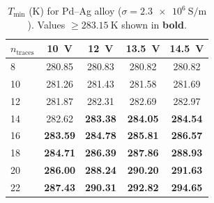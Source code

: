 \begin{table}[H]
    \centering
    \caption{$T_\text{min}$ (K) for Pd--Ag alloy ($\sigma = \SI{2.3e6}{\siemens\per\metre}$). Values $\geq \SI{283.15}{\kelvin}$ shown in \textbf{bold}.}
    \label{tab:sim2b-pdag}
    \begin{tabular}{@{}lcccc@{}}
        \toprule
        $n_\text{traces}$ & \SI{10}{\volt} & \SI{12}{\volt} & \SI{13.5}{\volt} & \SI{14.5}{\volt} \\
        \midrule
        8  & 280.85 & 280.83 & 280.82 & 280.82 \\
        10 & 281.26 & 281.43 & 281.58 & 281.69 \\
        12 & 281.87 & 282.31 & 282.69 & 282.97 \\
        14 & 282.62 & \textbf{283.38} & \textbf{284.05} & \textbf{284.54} \\
        16 & \textbf{283.59} & \textbf{284.78} & \textbf{285.81} & \textbf{286.57} \\
        18 & \textbf{284.71} & \textbf{286.39} & \textbf{287.86} & \textbf{288.93} \\
        20 & \textbf{286.00} & \textbf{288.24} & \textbf{290.20} & \textbf{291.63} \\
        22 & \textbf{287.43} & \textbf{290.31} & \textbf{292.82} & \textbf{294.65} \\
        \bottomrule
    \end{tabular}
\end{table}



